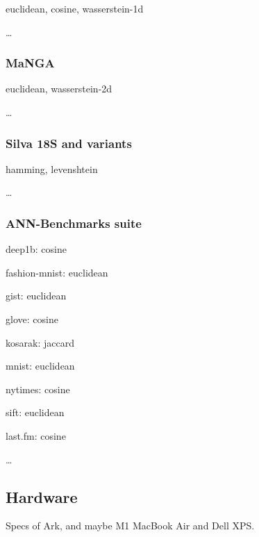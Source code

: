 euclidean, cosine, wasserstein-1d

\dots

\subsubsection{MaNGA}
\label{subsec:methods:datasets:manga}

euclidean, wasserstein-2d

\dots

\subsubsection{Silva 18S and variants}
\label{subsec:methods:datasets:silva-18s}

hamming, levenshtein

\dots

\subsubsection{ANN-Benchmarks suite}
\label{subsec:methods:datasets:ann-benchmarks-suite}

deep1b: cosine

fashion-mnist: euclidean

gist: euclidean

glove: cosine

kosarak: jaccard

mnist: euclidean

nytimes: cosine

sift: euclidean

last.fm: cosine

\dots

\subsection{Hardware}
\label{subsec:methods:hardware}

Specs of Ark, and maybe M1 MacBook Air and Dell XPS.


